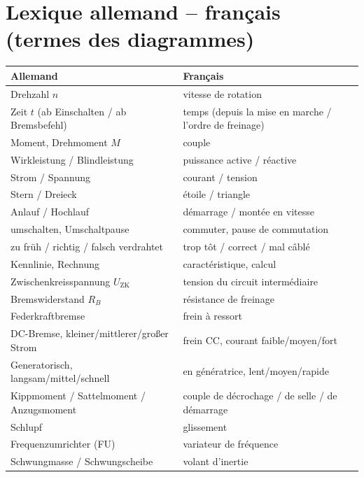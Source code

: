 \documentclass[11pt,a4paper]{article}
\begin{document}
\section{Lexique allemand -- français (termes des diagrammes)}
\label{sec:lexique}
\begin{center}
\small
\begin{tabular}{@{}p{}p{}@{}}
\toprule
Allemand & Français\\
\midrule
Drehzahl $n$ & vitesse de rotation\\
Zeit $t$ (ab Einschalten / ab Bremsbefehl) & temps (depuis la mise en marche / l'ordre de freinage)\\
Moment, Drehmoment $M$ & couple\\
Wirkleistung / Blindleistung & puissance active / réactive\\
Strom / Spannung & courant / tension\\
Stern / Dreieck & étoile / triangle\\
Anlauf / Hochlauf & démarrage / montée en vitesse\\
umschalten, Umschaltpause & commuter, pause de commutation\\
zu früh / richtig / falsch verdrahtet & trop tôt / correct / mal câblé\\
Kennlinie, Rechnung & caractéristique, calcul\\
Zwischenkreisspannung $U_\mathrm{ZK}$ & tension du circuit intermédiaire\\
Bremswiderstand $R_B$ & résistance de freinage\\
Federkraftbremse & frein à ressort\\
DC-Bremse, kleiner/mittlerer/großer Strom & frein CC, courant faible/moyen/fort\\
Generatorisch, langsam/mittel/schnell & en génératrice, lent/moyen/rapide\\
Kippmoment / Sattelmoment / Anzugsmoment & couple de décrochage / de selle / de démarrage\\
Schlupf & glissement\\
Frequenzumrichter (FU) & variateur de fréquence\\
Schwungmasse / Schwungscheibe & volant d'inertie\\
\bottomrule
\end{tabular}
\end{center}

\end{document}
